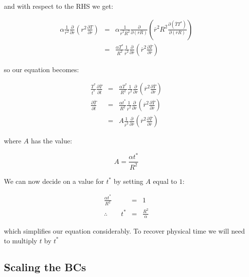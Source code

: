 \documentclass{report}
\begin{document}
and with respect to the RHS we get:\bigskip

\begin{eqnarray*} 
\alpha \frac{1}{r^2} \frac{\partial}{\partial r} \left( r^2 \frac{\partial T}{\partial r} \right) 
& = & \alpha \frac{1}{\overline{r}^2 R^2} \frac{\partial}{\partial (\overline{r} R)} \left( \overline{r}^2 R^2 \frac{\partial (\overline{T} T^*)}{\partial (\overline{r} R)} \right) \\
& = & \frac{\alpha T^*}{R^2} \frac{1}{\overline{r}^2} \frac{\partial}{\partial \overline{r}} \left( \overline{r}^2 \frac{\partial \overline{T}}{\partial \overline{r}} \right)
\end{eqnarray*}\medskip

so our equation becomes:\bigskip

\begin{eqnarray*} 
\frac{T^*}{t^*} \frac{\partial \overline{T}}{\partial \overline{t}} 
& = & \frac{\alpha T^*}{R^2} \frac{1}{\overline{r}^2} \frac{\partial}{\partial \overline{r}} \left( \overline{r}^2 \frac{\partial \overline{T}}{\partial \overline{r}} \right) \\
\frac{\partial \overline{T}}{\partial \overline{t}} 
& = & \frac{\alpha t^*}{R^2} \frac{1}{\overline{r}^2} \frac{\partial}{\partial \overline{r}} \left( \overline{r}^2 \frac{\partial \overline{T}}{\partial \overline{r}} \right) \\
& = & A \frac{1}{\overline{r}^2} \frac{\partial}{\partial \overline{r}} \left( \overline{r}^2 \frac{\partial \overline{T}}{\partial \overline{r}} \right)
\end{eqnarray*}\medskip

where $A$ has the value:\bigskip

\[
A = \frac{\alpha t^*}{R^2}
\]\medskip

We can now decide on a value for $t^*$ by setting $A$ equal to $1$:\bigskip

\begin{eqnarray*} 
\frac{\alpha t^*}{R^2} & = & 1 \\
 \therefore \qquad t^* & = & \frac{R^2}{\alpha}
\end{eqnarray*}\medskip

which simplifies our equation considerably. To recover physical time we will need to multiply 
$t$ by $t^*$



\subsection{Scaling the BCs}
\end{document}
